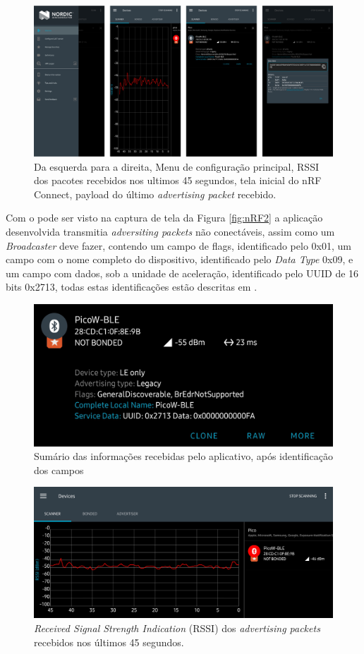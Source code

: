 \documentclass[a5paper]{ufsc-thesis}  %
\begin{document}
\begin{figure}[h]
    \centering
    \includegraphics[width=0.8\linewidth]{imagens/nRF.png}
    \caption{Da esquerda para a direita, Menu de configuração principal, RSSI dos pacotes recebidos nos ultimos 45 segundos, tela inicial do nRF Connect, payload do último \textit{advertising packet} recebido.}
    \label{fig:nRF_overall}
\end{figure}

Com o pode ser visto na captura de tela da Figura \ref{fig:nRF2} a aplicação desenvolvida transmitia \textit{adversiting packets} não conectáveis, assim como um \textit{Broadcaster} deve fazer, contendo um campo de flags, identificado pelo  0x01, um campo com o nome completo do dispositivo, identificado pelo \textit{Data Type} 0x09, e um campo com dados, sob a unidade de aceleração, identificado pelo UUID de 16 bits 0x2713, todas estas identificações estão descritas em \cite{bt_numbers}.

\begin{figure}[h]
    \centering
    \includegraphics[width=0.6\linewidth]{imagens/nRF1.png}
    \caption{Sumário das informações recebidas pelo aplicativo, após identificação dos campos}
    \label{fig:nRF1}
\end{figure}

\begin{figure}[h]
    \centering
    \includegraphics[width=0.9\linewidth]{imagens/nRF3.png}
    \caption{\textit{Received Signal Strength Indication} (RSSI) dos \textit{advertising packets} recebidos nos últimos 45 segundos.}
    \label{fig:nRF3}
\end{figure}
\end{document}

